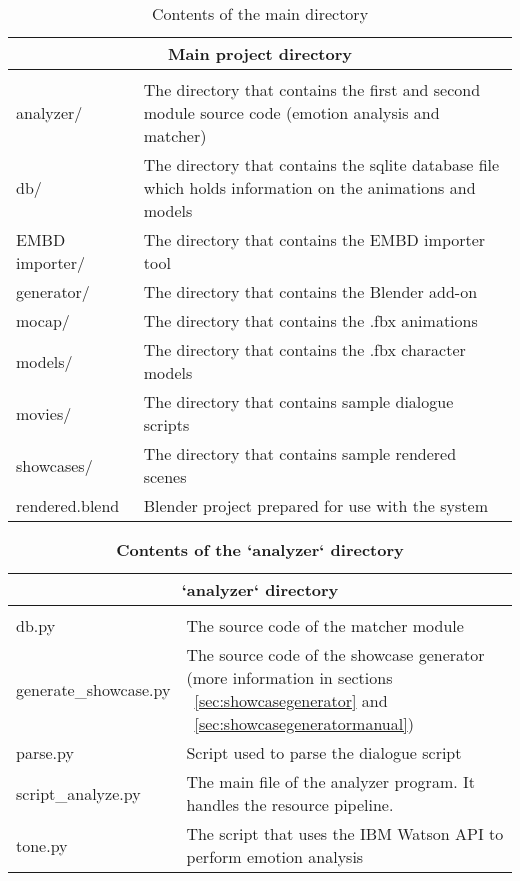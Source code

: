 \begin{table}[H]
	\centering
	\small
	
	\begin{tabular}{ |p{8.5em}|p{30.1em}| }
		\hline
		\multicolumn{2}{|c|}{\textbf{Main project directory}} \\
		\hline
		\thead{Item} & \thead{Description} \\
		\hline
		analyzer/ & The directory that contains the first and second module source code (emotion analysis and matcher) \\
		\hline
		db/ & The directory that contains the sqlite database file which holds information on the animations and models \\
		\hline
		EMBD importer/ & The directory that contains the EMBD importer tool \\
		\hline
		generator/ & The directory that contains the Blender add-on \\
		\hline
		mocap/ & The directory that contains the .fbx animations \\
		\hline
		models/ & The directory that contains the .fbx character models \\
		\hline
		movies/ & The directory that contains sample dialogue scripts \\
		\hline
		showcases/ & The directory that contains sample rendered scenes \\
		\hline
		rendered.blend & Blender project prepared for use with the system \\
		\hline
	\end{tabular}
	
	\caption{Contents of the main directory}
	\label{tab:maindirectory}
\end{table}

\begin{table}[H]
	\centering
	\small
	
	\begin{tabular}{ |p{8.5em}|p{30.1em}| }
		\hline
		\multicolumn{2}{|c|}{\textbf{`analyzer` directory}} \\
		\hline
		\thead{Item} & \thead{Description} \\
		\hline
		db.py & The source code of the matcher module \\
		\hline
		generate\_showcase.py & The source code of the showcase generator (more information in sections ~\ref{sec:showcasegenerator} and ~\ref{sec:showcasegeneratormanual}) \\
		\hline
		parse.py & Script used to parse the dialogue script \\
		\hline
		script\_analyze.py & The main file of the analyzer program. It handles the resource pipeline. \\
		\hline
		tone.py & The script that uses the IBM Watson API to perform emotion analysis \\
		\hline
	\end{tabular}
	
	\caption{\textbf{Contents of the `analyzer` directory}}
	\label{tab:analyzerdirectory}
\end{table}

